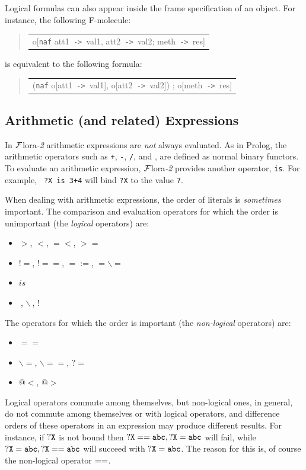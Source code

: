 \documentclass[11pt]{article}
\newenvironment{qrules}{\begin{quote}\tt\begin{tabular}[t]{l}}%
{\end{tabular}\end{quote}}
\newcommand{\mvd}{{\mbox{\tt \,->\,}}}  %
\newcommand{\FLORA}{{\mbox{\sc ${\cal F}${lora}\rm\emph{-2}}}\xspace}
\newcommand{\RULELOGNAF}{{{\tt naf}}\xspace}
\begin{document}
%
Logical formulas can also appear inside the frame specification of an object. For
instance, the following F-molecule:
\begin{qrules}
o[\RULELOGNAF att1{\mvd}val1, att2{\mvd}val2; meth{\mvd}res]
\end{qrules}
is equivalent to the following formula:
\begin{qrules}
(\RULELOGNAF o[att1{\mvd}val1], o[att2{\mvd}val2]) ; o[meth{\mvd}res]
\end{qrules}


\subsection{Arithmetic (and related) Expressions}


In \FLORA arithmetic expressions are \emph{not} always evaluated. As in
Prolog, the arithmetic operators such as {\tt +}, {\tt -}, {\tt /}, and
{\tt *}, are defined as normal binary functors. To evaluate an arithmetic
expression, \FLORA provides another operator, {\tt is}.  For example, {\tt
  ?X is 3+4} will bind {\tt ?X} to the value {\tt 7}.

When dealing with arithmetic expressions, the order of literals is
\emph{sometimes} important.
The comparison and evaluation operators for which the order is unimportant
(the \emph{logical} operators)  are:
\begin{itemize}
\item  $>$, $<$, $=<$, $>=$
\item  $!=$, $!==$, $=:=$, $=\backslash=$
\item $is$
\item $~$, $\backslash~$, $!~$
\end{itemize}
The operators for which the order is important (the \emph{non-logical}
operators) are:
\begin{itemize}
\item  $==$
\item  $\backslash=$, $\backslash==$, $?=$
\item  $@<$, $@>$
\end{itemize}
Logical operators commute among themselves, but non-logical ones, in
general, do not commute among themselves or with logical operators, and
difference orders of these operators in an expression  may produce different
results. For instance, if $\tt ?X$ is not bound then $\tt ?X == abc, ?X=abc$ will
fail, while  $\tt ?X=abc, ?X == abc$ will succeed with $\tt ?X = abc$.
The reason for this is, of course the non-logical operator $\tt ==$.
\end{document}
